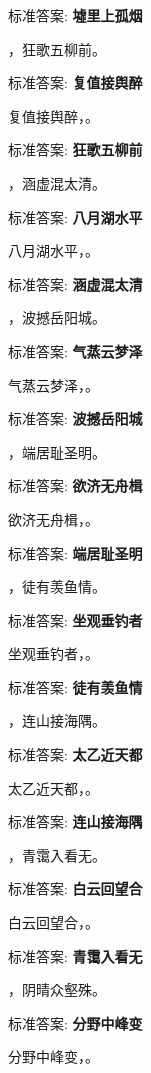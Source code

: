 \documentclass[12pt, a4paper, addpoints]{exam}
\begin{document}
\begin{questions}
标准答案: \textbf{墟里上孤烟}

\question[1] \uline{\qquad\qquad\qquad}，狂歌五柳前。

标准答案: \textbf{复值接舆醉}

\question[1] 复值接舆醉，\uline{\qquad\qquad\qquad}。

标准答案: \textbf{狂歌五柳前}

\question[1] \uline{\qquad\qquad\qquad}，涵虚混太清。

标准答案: \textbf{八月湖水平}

\question[1] 八月湖水平，\uline{\qquad\qquad\qquad}。

标准答案: \textbf{涵虚混太清}

\question[1] \uline{\qquad\qquad\qquad}，波撼岳阳城。

标准答案: \textbf{气蒸云梦泽}

\question[1] 气蒸云梦泽，\uline{\qquad\qquad\qquad}。

标准答案: \textbf{波撼岳阳城}

\question[1] \uline{\qquad\qquad\qquad}，端居耻圣明。

标准答案: \textbf{欲济无舟楫}

\question[1] 欲济无舟楫，\uline{\qquad\qquad\qquad}。

标准答案: \textbf{端居耻圣明}

\question[1] \uline{\qquad\qquad\qquad}，徒有羡鱼情。

标准答案: \textbf{坐观垂钓者}

\question[1] 坐观垂钓者，\uline{\qquad\qquad\qquad}。

标准答案: \textbf{徒有羡鱼情}

\question[1] \uline{\qquad\qquad\qquad}，连山接海隅。

标准答案: \textbf{太乙近天都}

\question[1] 太乙近天都，\uline{\qquad\qquad\qquad}。

标准答案: \textbf{连山接海隅}

\question[1] \uline{\qquad\qquad\qquad}，青霭入看无。

标准答案: \textbf{白云回望合}

\question[1] 白云回望合，\uline{\qquad\qquad\qquad}。

标准答案: \textbf{青霭入看无}

\question[1] \uline{\qquad\qquad\qquad}，阴晴众壑殊。

标准答案: \textbf{分野中峰变}

\question[1] 分野中峰变，\uline{\qquad\qquad\qquad}。


\end{questions}
\end{document}
